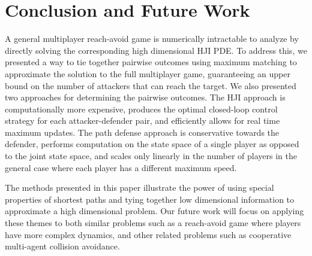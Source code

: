 \section{Conclusion and Future Work}
\label{sec:conclusion}
A general multiplayer reach-avoid game is numerically intractable to analyze by directly solving the corresponding high dimensional HJI PDE. To address this, we presented a way to tie together pairwise outcomes using maximum matching to approximate the solution to the full multiplayer game, guaranteeing an upper bound on the number of attackers that can reach the target. We also presented two approaches for determining the pairwise outcomes. The HJI approach is computationally more expensive, produces the optimal closed-loop control strategy for each attacker-defender pair, and efficiently allows for real time maximum updates. The path defense approach is conservative towards the defender, performs computation on the state space of a single player as opposed to the joint state space, and scales only linearly in the number of players in the general case where each player has a different maximum speed.

The methods presented in this paper illustrate the power of using special properties of shortest paths and tying together low dimensional information to approximate a high dimensional problem. Our future work will focus on applying these themes to both similar problems such as a reach-avoid game where players have more complex dynamics, and other related problems such as cooperative multi-agent collision avoidance.